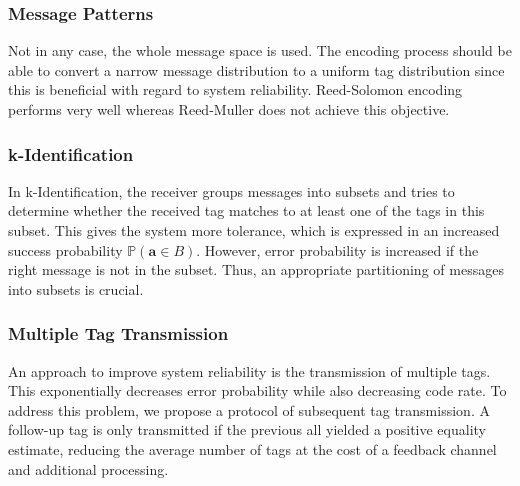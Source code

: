 \documentclass[%
  english,%
  paper=A1,%
  fontsize=22pt,%
  cdfoot=5ex,%
  ddcfoot,%
  BCOR=-20mm,
]{tudscrposter}
\begin{document}
\begin{multicols}{3}
    \subsubsection*{Message Patterns}
    {\centering %
    
    \par}
    
    \vfill %
    
    Not in any case, the whole message space is used. The encoding process should be able to convert a narrow message distribution to a uniform tag distribution since this is beneficial with regard to system reliability. Reed-Solomon encoding performs very well whereas Reed-Muller does not achieve this objective.
    
    \columnbreak
    
    \subsubsection*{k-Identification}
    {\centering
    
    \par}


    In k-Identification, the receiver groups messages into subsets and tries to determine whether the received tag matches to at least one of the tags in this subset. This gives the system more tolerance, which is expressed in an increased success probability $ \mathbb{P}(\boldsymbol{a} \in B)$. However, error probability is increased if the right message is not in the subset. Thus, an appropriate partitioning of messages into subsets is crucial.
    
    \columnbreak
    
    \subsubsection*{Multiple Tag Transmission}
    {\centering
    
    \par}

    An approach to improve system reliability is the transmission of multiple tags. This exponentially decreases error probability while also decreasing code rate. To address this problem, we propose a protocol of subsequent tag transmission. A follow-up tag is only transmitted if the previous all yielded a positive equality estimate, reducing the average number of tags at the cost of a feedback channel and additional processing.
\end{multicols}
\end{document}
